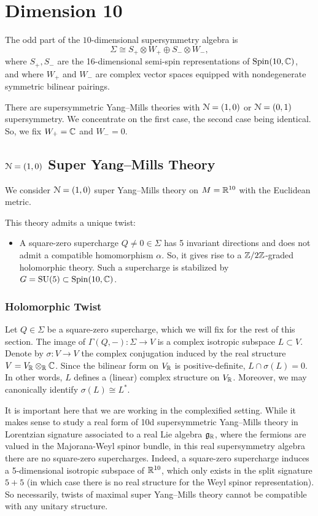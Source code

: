 \documentclass[10pt, oneside]{article}
\begin{document}
\section{Dimension 10}

The odd part of the $10$-dimensional supersymmetry algebra is 
\[
\Sigma\cong S_+\otimes W_+\oplus S_-\otimes W_-,
\] 
where $S_+, S_-$ are the 16-dimensional semi-spin representations of $\mathrm{Spin}(10, \mathbb C)$, and where $W_+$ and $W_-$ are complex vector spaces equipped with nondegenerate symmetric bilinear pairings. 

There are supersymmetric Yang--Mills theories with $\mathcal N=(1, 0)$ or $\mathcal N=(0, 1)$ supersymmetry. 
We concentrate on the first case, the second case being identical. 
So, we fix $W_+=\mathbb C$ and $W_- = 0$.

\subsection{\texorpdfstring{$\mathcal N=(1, 0)$}{N=(1,0)} Super Yang--Mills Theory}

We consider $\mathcal N=(1, 0)$ super Yang--Mills theory on $M=\mathbb R^{10}$ with the Euclidean metric.

This theory admits a unique twist:
\begin{itemize}
\item A square-zero supercharge $Q\neq 0\in\Sigma$ has 5 invariant directions and does not admit a compatible homomorphism $\alpha$. So, it gives rise to a $\mathbb Z/2\mathbb Z$-graded holomorphic theory. Such a supercharge is stabilized by $G=\mathrm{SU}(5)\subset \mathrm{Spin}(10, \mathbb C)$.
\end{itemize}

\subsubsection{Holomorphic Twist}
\label{sect:10dholomorphictwist}

Let $Q\in\Sigma$ be a square-zero supercharge, which we will fix for the rest of this section. 
The image of $\Gamma(Q, -)\colon \Sigma\rightarrow V$ is a complex isotropic subspace $L\subset V$. Denote by $\sigma\colon V\rightarrow V$ the complex conjugation induced by the real structure $V = V_\mathbb R\otimes_\mathbb R\mathbb C$. Since the bilinear form on $V_\mathbb R$ is positive-definite, $L\cap \sigma(L) = 0$. In other words, $L$ defines a (linear) complex structure on $V_\mathbb R$. Moreover, we may canonically identify $\sigma(L)\cong L^*$.

\begin{remark}
It is important here that we are working in the complexified setting.  While it makes sense to study a real form of 10d supersymmetric Yang--Mills theory in Lorentzian signature associated to a real Lie algebra $\mathfrak{g}_\mathbb R$, where the fermions are valued in the Majorana-Weyl spinor bundle, in this real supersymmetry algebra there are no square-zero supercharges. Indeed, a square-zero supercharge induces a 5-dimensional isotropic subspace of $\mathbb R^{10}$, which only exists in the split signature $5+5$ (in which case there is no real structure for the Weyl spinor representation).  So necessarily, twists of maximal super Yang--Mills theory cannot be compatible with any unitary structure.
\end{remark}
\end{document}
